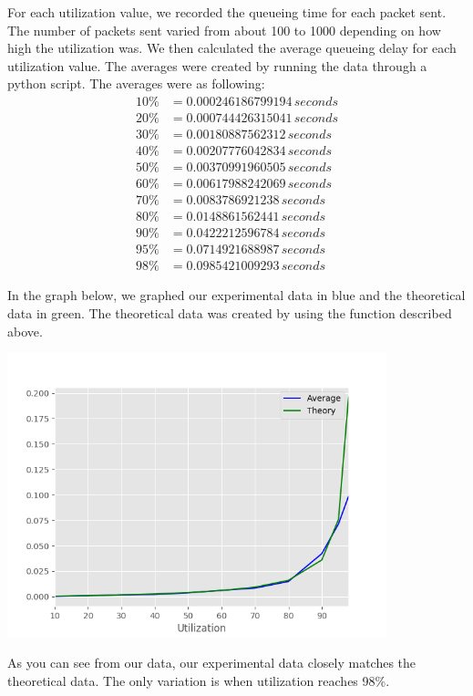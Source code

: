 \documentclass[fleqn,11pt]{article}
\begin{document}
For each utilization value, we recorded the queueing time for each packet sent. The number of packets sent varied from about 100 to 1000 depending on how high the utilization was. We then calculated the average queueing delay for each utilization value. The averages were created by running the data through a python script. The averages were as following:
\begin{align*}
10\%&=0.000246186799194\,seconds\\
20\%&=0.000744426315041\,seconds\\
30\%&=0.00180887562312\,seconds\\
40\%&=0.00207776042834\,seconds\\
50\%&=0.00370991960505\,seconds\\
60\%&=0.00617988242069\,seconds\\
70\%&=0.0083786921238\,seconds\\
80\%&=0.0148861562441\,seconds\\
90\%&=0.0422212596784\,seconds\\
95\%&=0.0714921688987\,seconds\\
98\%&=0.0985421009293\,seconds
\end{align*}


In the graph below, we graphed our experimental data in blue and the theoretical data in green. The theoretical data was created by using the function described above. 

\includegraphics[width=11cm]{lab1-graph}

As you can see from our data, our experimental data closely matches the theoretical data. The only variation is when utilization reaches 98\%.
\end{document}
